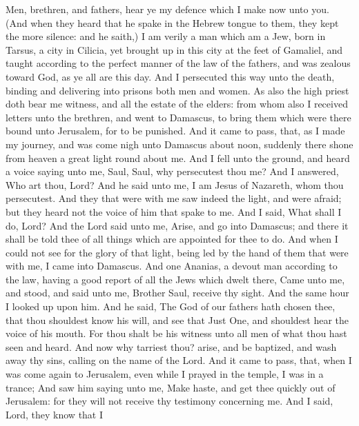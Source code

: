  Men, brethren, and fathers, hear ye my defence which I make
now unto you.  (And when they heard that he spake in the
Hebrew tongue to them, they kept the more silence: and he saith,)
 I am verily a man which am a Jew, born in Tarsus, a city in
Cilicia, yet brought up in this city at the feet of Gamaliel, and taught
according to the perfect manner of the law of the fathers, and was
zealous toward God, as ye all are this day.  And I
persecuted this way unto the death, binding and delivering into prisons
both men and women.  As also the high priest doth bear me
witness, and all the estate of the elders: from whom also I received
letters unto the brethren, and went to Damascus, to bring them which
were there bound unto Jerusalem, for to be punished.  And it
came to pass, that, as I made my journey, and was come nigh unto
Damascus about noon, suddenly there shone from heaven a great light
round about me.  And I fell unto the ground, and heard a
voice saying unto me, Saul, Saul, why persecutest thou me? 
And I answered, Who art thou, Lord? And he said unto me, I am Jesus of
Nazareth, whom thou persecutest.  And they that were with me
saw indeed the light, and were afraid; but they heard not the voice of
him that spake to me.  And I said, What shall I do, Lord?
And the Lord said unto me, Arise, and go into Damascus; and there it
shall be told thee of all things which are appointed for thee to do.
 And when I could not see for the glory of that light,
being led by the hand of them that were with me, I came into Damascus.
 And one Ananias, a devout man according to the law, having
a good report of all the Jews which dwelt there,  Came unto
me, and stood, and said unto me, Brother Saul, receive thy sight. And
the same hour I looked up upon him.  And he said, The God
of our fathers hath chosen thee, that thou shouldest know his will, and
see that Just One, and shouldest hear the voice of his mouth.
 For thou shalt be his witness unto all men of what thou
hast seen and heard.  And now why tarriest thou? arise, and
be baptized, and wash away thy sins, calling on the name of the Lord.
 And it came to pass, that, when I was come again to
Jerusalem, even while I prayed in the temple, I was in a trance;
 And saw him saying unto me, Make haste, and get thee
quickly out of Jerusalem: for they will not receive thy testimony
concerning me.  And I said, Lord, they know that I
